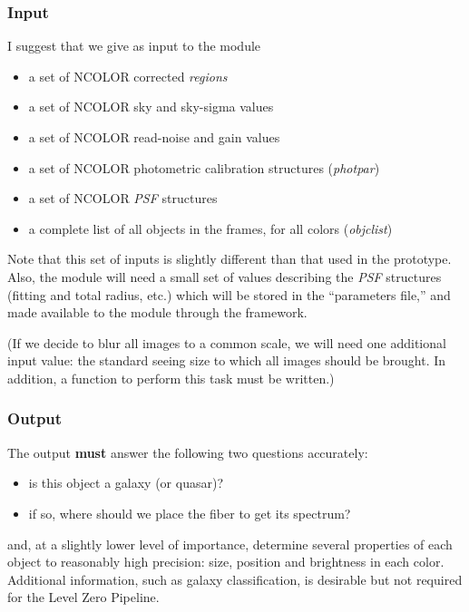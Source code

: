 \subsubsection {Input}

  I suggest that we give as input to the module

\begin {itemize}
  \item a set of NCOLOR corrected {\it regions}
  \item a set of NCOLOR sky and sky-sigma values
  \item a set of NCOLOR read-noise and gain values
  \item a set of NCOLOR photometric calibration structures ({\it photpar})
  \item a set of NCOLOR {\it PSF} structures
  \item a complete list of all objects in the frames, for all colors 
            ({\it objclist})
\end {itemize}

Note that this set of inputs is slightly different than that used in the
prototype.
Also, the module will need a small set of 
values describing the {\it PSF} structures (fitting and total
radius, etc.) which will be stored in the ``parameters file,''
and made available to the module through the framework.

(If we decide to blur all images to a common scale, we will
need one additional input value: the standard seeing size to 
which all images should be brought.  In addition, a function 
to perform this task must be written.)

\subsubsection {Output}

  The output {\bf must} answer the following two questions
accurately:

\begin {itemize}
   \item is this object a galaxy (or quasar)?
   \item if so, where should we place the fiber to get its spectrum?
\end {itemize}

and, at a slightly lower level of importance, determine several
properties of each object to reasonably high precision: size,
position and brightness in each color.  Additional information,
such as galaxy classification,
is desirable but not required for the Level Zero
Pipeline.

